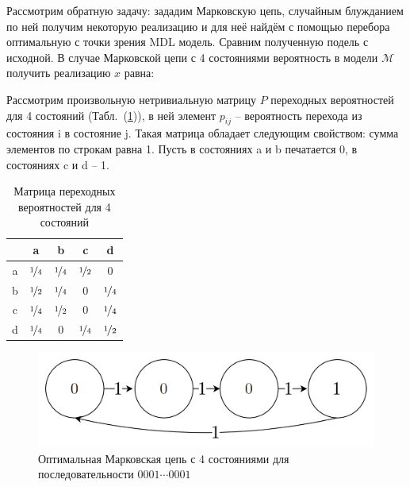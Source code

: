 \documentclass[12pt]{article}
\begin{document}
	Рассмотрим обратную задачу: зададим Марковскую цепь, случайным блужданием по ней получим некоторую реализацию и для неё найдём с помощью перебора оптимальную с точки зрения MDL модель. Сравним полученную подель с исходной. В случае Марковской цепи с 4 состояниями вероятность в модели $\mathcal{M}$ получить реализацию $x$ равна:
	
	Рассмотрим произвольную нетривиальную матрицу $P$ переходных вероятностей для 4 состояний (Табл.~(\ref{table:matrix4})), в ней элемент $p_{ij}$ -- вероятность перехода из состояния i в состояние j. Такая матрица обладает следующим свойством: сумма элементов по строкам равна 1. Пусть в состояниях a и b печатается 0, в состояниях c и d -- 1.
	
	\begin{table}[!h]
		\caption{Матрица переходных вероятностей для 4 состояний}
		\label{table:matrix4}
		\begin{center}
			\begin{tabular}{|c|c|c|c|c|}
				\hline
				 & a & b & c & d \\
				\hline
				a & $\nicefrac{1}{4}$ & $\nicefrac{1}{4}$ & $\nicefrac{1}{2}$ & 0\\
				\hline
				b & $\nicefrac{1}{2}$ & $\nicefrac{1}{4}$ & 0 & $\nicefrac{1}{4}$ \\
				\hline
				c & $\nicefrac{1}{4}$ & $\nicefrac{1}{2}$ & 0 & $\nicefrac{1}{4}$ \\
				\hline
				d & $\nicefrac{1}{4}$ & 0 & $\nicefrac{1}{4}$ & $\nicefrac{1}{2}$ \\
				\hline
			\end{tabular}
		\end{center}
	\end{table}

	\begin{figure}[h]
		\caption{Оптимальная Марковская цепь с 4 состояниями для последовательности $0001\cdots0001$}
		\label{pic:M4}
		\centering
		\includegraphics[width=0.6\linewidth]{images/M4_0001.png}
	\end{figure}
	
\end{document}
